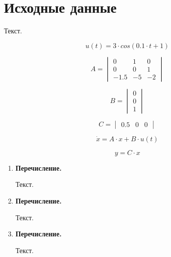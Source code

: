 \documentclass[14pt,a4paper]{extreport}
\begin{document}


\newpage
\tableofcontents



\newpage
\chapter*{Исходные данные}

Текст.

\begin{equation}
    u(t) = 3 \cdot  cos(0.1 \cdot t + 1)
\end{equation}

\begin{equation}
    A = 
    \begin{vmatrix} 
        0 & 1 & 0 \\ 
        0 & 0 & 1 \\
        -1.5 & -5 & -2
    \end{vmatrix}
\end{equation}

\begin{equation}
    B = 
    \begin{vmatrix} 
        0 \\ 
        0 \\
        1
    \end{vmatrix}
\end{equation}

\begin{equation}
    C = 
    \begin{vmatrix} 
        0.5 & 0 & 0
    \end{vmatrix}
\end{equation}

\begin{equation}
\dot x = A \cdot x + B \cdot u(t)
\end{equation}

\begin{equation}
y = C \cdot x
\end{equation}

\begin{enumerate}
    \item {\bfseries Перечисление.}
    
    Текст.
    \item {\bfseries Перечисление.}
    
    Текст.
    \item {\bfseries Перечисление.}
    
    Текст.
\end{enumerate}
\end{document}

